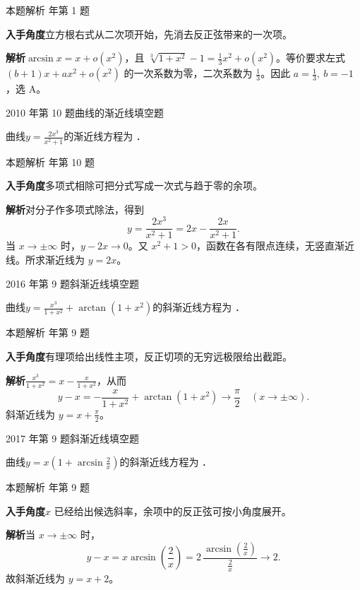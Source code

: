 \documentclass[UTF8,zihao=-4,fontset=fandol]{ctexart}
\newcommand{\blank}{\underline{\hspace{5em}}}
\newcommand{\QuestionPage}[6]{%
  \par\noindent\begin{minipage}{\linewidth}
  \raggedright
  {\small\textcolor{black!60}{#3\quad #5}\hfill\textcolor{accent}{#2}}\par\smallskip}
\newcommand{\QuestionEnd}{\end{minipage}\par\medskip}
\newcommand{\QuestionPage}[6]{%
  \clearpage
  {\small\textcolor{accent}{#1\hfill #2}}\par\medskip
  {\small\textcolor{black!60}{#3\quad #5\hfill #6}}\par\vspace{9bp}}
\newcommand{\QuestionEnd}{}
\newenvironment{QuestionSolution}[1]{%
  \clearpage
  {\small\textcolor{black!60}{本题解析\quad #1}}\par\medskip
}{\par\clearpage}
\begin{document}
\begin{QuestionSolution}{2026 年第 1 题}
\textbf{入手角度}\quad 立方根右式从二次项开始，先消去反正弦带来的一次项。

\textbf{解析}\quad \(\arcsin x=x+o(x^2)\)，且
\(\sqrt[3]{1+x^2}-1=\tfrac13x^2+o(x^2)\)。等价要求左式 \((b+1)x+ax^2+o(x^2)\) 的一次系数为零，二次系数为 \(\frac{1}{3}\)。因此 \(\boxed{a=\frac{1}{3},\ b=-1}\)，选 A。
\end{QuestionSolution}

\QuestionPage{1.4 无穷小量与无穷大量}{填空题}{2010 年第 10 题}{2}{曲线的渐近线}{031 / 234}
曲线$y = \frac{2x^3}{x^2 + 1}$的渐近线方程为 \blank{}．
\QuestionEnd

\begin{QuestionSolution}{2010 年第 10 题}
\textbf{入手角度}\quad 多项式相除可把分式写成一次式与趋于零的余项。

\textbf{解析}\quad 对分子作多项式除法，得到
\[
y=\frac{2x^3}{x^2+1}=2x-\frac{2x}{x^2+1}.
\]
当 \(x\to\pm\infty\) 时，\(y-2x\to0\)。又 \(x^2+1>0\)，函数在各有限点连续，无竖直渐近线。所求渐近线为 \(\boxed{y=2x}\)。
\end{QuestionSolution}

\QuestionPage{1.4 无穷小量与无穷大量}{填空题}{2016 年第 9 题}{2}{斜渐近线}{032 / 234}
曲线$y = \frac{x^3}{1 + x^2} + \arctan(1 + x^2)$的斜渐近线方程为 \blank{}．
\QuestionEnd

\begin{QuestionSolution}{2016 年第 9 题}
\textbf{入手角度}\quad 有理项给出线性主项，反正切项的无穷远极限给出截距。

\textbf{解析}\quad \(\frac{x^3}{1+x^2}=x-\frac{x}{1+x^2}\)，从而
\[
y-x=-\frac{x}{1+x^2}+\arctan(1+x^2)\longrightarrow\frac\pi2
\quad(x\to\pm\infty).
\]
斜渐近线为 \(\boxed{y=x+\frac{\pi}{2}}\)。
\end{QuestionSolution}

\QuestionPage{1.4 无穷小量与无穷大量}{填空题}{2017 年第 9 题}{2}{斜渐近线}{033 / 234}
曲线$y = x\left(1 + \arcsin \frac{2}{x} \right)$的斜渐近线方程为 \blank{}．
\QuestionEnd

\begin{QuestionSolution}{2017 年第 9 题}
\textbf{入手角度}\quad \(x\) 已经给出候选斜率，余项中的反正弦可按小角度展开。

\textbf{解析}\quad 当 \(x\to\pm\infty\) 时，
\[
y-x=x\arcsin(\frac{2}{x})=2\,\frac{\arcsin(\frac{2}{x})}{\frac{2}{x}}\longrightarrow2.
\]
故斜渐近线为 \(\boxed{y=x+2}\)。
\end{QuestionSolution}
\end{document}
